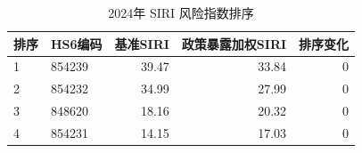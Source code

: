 \begin{table}[H]
\centering
\caption{2024年 SIRI 风险指数排序}
\label{tab:siri-ranking}
\begin{tabular}{llrrr}
\toprule
排序 & HS6编码 & 基准SIRI & 政策暴露加权SIRI & 排序变化 \\
\midrule
1 & 854239 & 39.47 & 33.84 & 0 \\
2 & 854232 & 34.99 & 27.99 & 0 \\
3 & 848620 & 18.16 & 20.32 & 0 \\
4 & 854231 & 14.15 & 17.03 & 0 \\
\bottomrule
\end{tabular}
\end{table}
